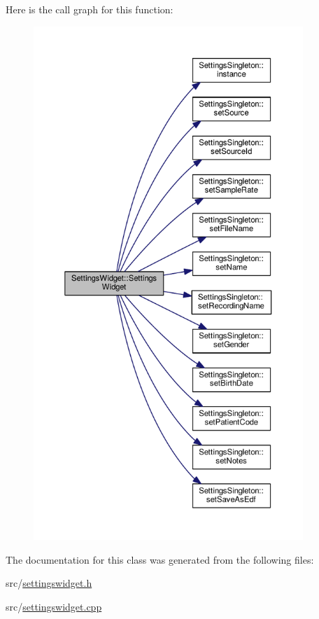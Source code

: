Here is the call graph for this function\+:
\nopagebreak
\begin{figure}[H]
\begin{center}
\leavevmode
\includegraphics[height=550pt]{classSettingsWidget_a339891dcba7d2813bc5d894bff494a78_cgraph}
\end{center}
\end{figure}




The documentation for this class was generated from the following files\+:\begin{DoxyCompactItemize}
\item 
src/\hyperlink{settingswidget_8h}{settingswidget.\+h}\item 
src/\hyperlink{settingswidget_8cpp}{settingswidget.\+cpp}\end{DoxyCompactItemize}
